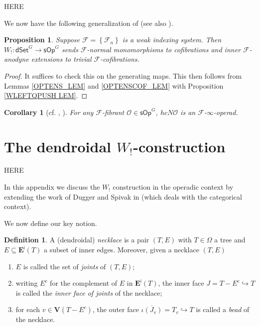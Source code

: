 \documentclass[a4paper,10pt
,draft
]{article}%
\numberwithin{equation}{section}
\numberwithin{figure}{section}
\newtheorem{proposition}[equation]{Proposition}%
\newtheorem{corollary}[equation]{Corollary}%
\theoremstyle{definition} %
\newtheorem{definition}[equation]{Definition}%
\newcommand{\set}[1]{\left\{#1\right\}}%
\newcommand{\sOp}{\ensuremath{\mathsf{sOp}}}%
\newcommand{\dSet}{\mathsf{dSet}}
\newcommand{\F}{\ensuremath{\mathcal F}}
\renewcommand{\O}{\ensuremath{\mathcal O}}
\newcommand{\1}{\ensuremath{\mathbbm 1}}%
\begin{document}
{\color{red} HERE}




We now have the following generalization of \cite[Prop 4.5]{CM13b} (see also \cite[Prop. 6.15]{Per18}).


\begin{proposition}
	\label{W!_COF_PROP}
	Suppose $\F = \set{\F_n}$ is a weak indexing system.
	Then $W_!: \dSet^G \to \sOp^G$ sends $\F$-normal monomorphisms to cofibrations and inner $\F$-anodyne extensions to trivial $\F$-cofibrations.
\end{proposition}

\begin{proof}
	It suffices to check this on the generating maps.
	This then follows from
	Lemmas \ref{OPTENS_LEM} and \ref{OPTENSCOF_LEM} with Proposition \ref{WLEFTQPUSH LEM}.
\end{proof}




\begin{corollary}
	[{cf. \cite[Prop. 6.15]{Per18}, \cite[Cor. 4.6]{CM11}}]
	For any $\F$-fibrant $\O \in \sOp^G$, $h c N \O$ is an $\F$-$\infty$-operad.
\end{corollary}









\newpage
\appendix





\section{The dendroidal $W_!$-construction}
\label{WCONS AP}



{\color{red} HERE}




In this appendix we discuss the $W_!$ 
construction in the operadic context by extending the  
work of Dugger and Spivak in \cite{DS11} 
(which deals with the categorical context).





We now define our key notion.
\begin{definition}
A (dendroidal) \emph{necklace} is a pair $(T,E)$
with $T \in \Omega$
a tree and
$E \subseteq \boldsymbol{E}^{\mathsf{i}}(T)$
a subset of inner edges.
%
Moreover, given a necklace $(T,E)$
\begin{enumerate}[label = (\roman*)]
\item $E$ is called the set of \emph{joints} of $(T,E)$;
\item writing $E^c$ for the complement of $E$ in 
$\boldsymbol{E}^{\mathsf{i}}(T)$,
the inner face $J=T-E^c \hookrightarrow T$
is called the \emph{inner face of joints} of the necklace;
\item for each $v \in \boldsymbol{V}(T-E^c)$,
the outer face
$\overline{\iota(J_v)} = T_v \hookrightarrow T$
is called a \emph{bead} of the necklace.
\end{enumerate}
\end{definition}
\end{document}
